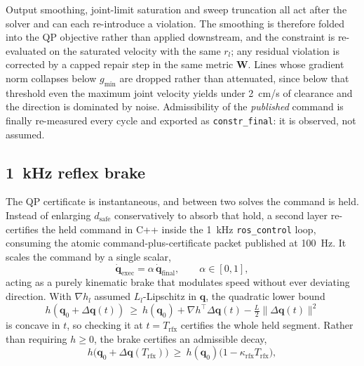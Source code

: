 \documentclass[journal]{IEEEtran}
\newcommand{\qdot}{\dot{\mathbf{q}}}
\newcommand{\dsafe}{d_{\mathrm{safe}}}
\begin{document}
Output smoothing, joint-limit saturation and sweep truncation all act after the solver and can each re-introduce a violation. The smoothing is therefore folded into the QP objective rather than applied downstream, and the constraint is re-evaluated on the saturated velocity with the same $r_l$; any residual violation is corrected by a capped repair step in the same metric $\mathbf{W}$. Lines whose gradient norm collapses below $g_{\min}$ are dropped rather than attenuated, since below that threshold even the maximum joint velocity yields under 2~cm/s of clearance and the direction is dominated by noise. Admissibility of the \emph{published} command is finally re-measured every cycle and exported as \texttt{constr\_final}: it is observed, not assumed.

\subsection{1~kHz reflex brake}
The QP certificate is instantaneous, and between two solves the command is held. Instead of enlarging $\dsafe$ conservatively to absorb that hold, a second layer re-certifies the held command in C++ inside the 1~kHz \texttt{ros\_control} loop, consuming the atomic command-plus-certificate packet published at 100~Hz. It scales the command by a single scalar,
\begin{equation}
\qdot_{\mathrm{exec}}=\alpha\,\qdot_{\mathrm{final}},\qquad\alpha\in[0,1],
\end{equation}
acting as a purely kinematic brake that modulates speed without ever deviating direction. With $\nabla h_l$ assumed $L_l$-Lipschitz in $\mathbf{q}$, the quadratic lower bound
\begin{equation}
h(\mathbf{q}_0+\Delta\mathbf{q}(t))\ \ge\ h(\mathbf{q}_0)+\nabla h^{\top}\Delta\mathbf{q}(t)-\tfrac{L}{2}\|\Delta\mathbf{q}(t)\|^2
\end{equation}
is concave in $t$, so checking it at $t=T_{\mathrm{rfx}}$ certifies the whole held segment. Rather than requiring $h\ge0$, the brake certifies an admissible decay,
\begin{equation}\label{eq:reflex}
h\big(\mathbf{q}_0+\Delta\mathbf{q}(T_{\mathrm{rfx}})\big)\ \ge\ h(\mathbf{q}_0)\big(1-\kappa_{\mathrm{rfx}}T_{\mathrm{rfx}}\big),
\end{equation}
\end{document}
